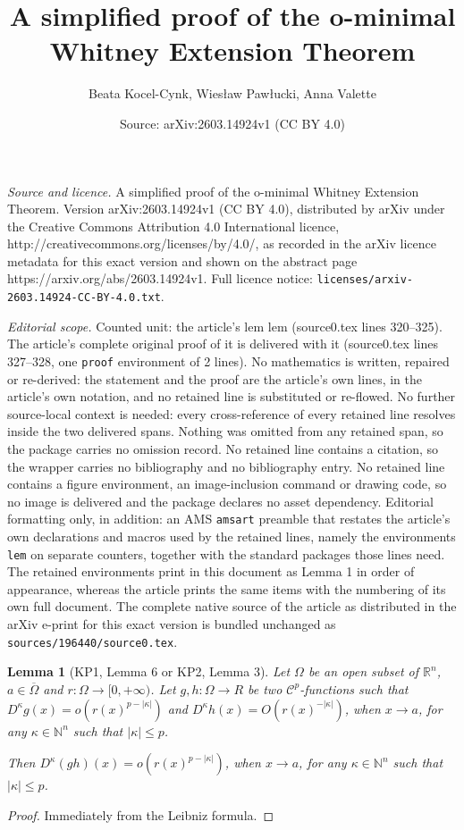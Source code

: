 \documentclass[10pt,a4paper]{amsart}
\title{A simplified proof of the o-minimal Whitney Extension Theorem}
\author{Beata Kocel-Cynk, Wies{\l}aw Paw{\l}ucki, Anna Valette}
\date{Source: arXiv:2603.14924v1 (CC BY 4.0)}
\newtheorem{lem}{Lemma}
\newcommand{\Real}{\mathbb R}
\begin{document}
\maketitle

\noindent\emph{Source and licence.} A simplified proof of the o-minimal Whitney Extension Theorem. Version arXiv:2603.14924v1 (CC BY 4.0), distributed by arXiv under the Creative Commons Attribution 4.0 International licence, http://creativecommons.org/licenses/by/4.0/, as recorded in the arXiv licence metadata for this exact version and shown on the abstract page https://arxiv.org/abs/2603.14924v1. Full licence notice: \texttt{licenses/arxiv-2603.14924-CC-BY-4.0.txt}.\par\smallskip

\noindent\textit{Editorial scope.} Counted unit: the article's lem lem (source0.tex lines 320--325). The article's complete original proof of it is delivered with it (source0.tex lines 327--328, one \texttt{proof} environment of 2 lines). No mathematics is written, repaired or re-derived: the statement and the proof are the article's own lines, in the article's own notation, and no retained line is substituted or re-flowed.  No further source-local context is needed: every cross-reference of every retained line resolves inside the two delivered spans.  Nothing was omitted from any retained span, so the package carries no omission record.  No retained line contains a citation, so the wrapper carries no bibliography and no bibliography entry.  No retained line contains a figure environment, an image-inclusion command or drawing code, so no image is delivered and the package declares no asset dependency.  Editorial formatting only, in addition: an AMS \texttt{amsart} preamble that restates the article's own declarations and macros used by the retained lines, namely the environments \texttt{lem} on separate counters, together with the standard packages those lines need.  The retained environments print in this document as Lemma 1 in order of appearance, whereas the article prints the same items with the numbering of its own full document.  The complete native source of the article as distributed in the arXiv e-print for this exact version is bundled unchanged as \texttt{sources/196440/source0.tex}.
\begin{lem} [\lbrack KP1, Lemma 6 or KP2, Lemma 3\rbrack] Let $\varOmega$ be an open subset of $\Real^n$, $a\in \overline{\varOmega}$ and $r:\varOmega\longrightarrow [0, +\infty)$.
Let $g, h: \varOmega\longrightarrow R$ be two $\mathcal{C}^p$-functions such that $D^{\kappa}g(x) = o(r(x)^{p-|\kappa|})$ and $D^{\kappa}h(x) = O(r(x)^{-|\kappa|})$, when $x\rightarrow a$, for any $\kappa\in \mathbb{N}^n$ such that $|\kappa|\leq p$.

\medskip
Then $D^{\kappa}(gh)(x) = o(r(x)^{p-|\kappa|})$, when $x\rightarrow a$, for any $\kappa\in \mathbb{N}^n$ such that $|\kappa|\leq p$.
\end{lem}

\begin{proof} Immediately from the Leibniz formula.
\end{proof}
\end{document}
